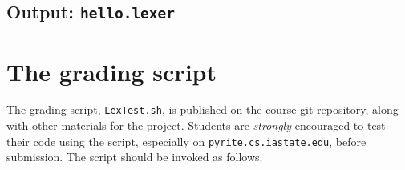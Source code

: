 \documentclass{article}
\begin{document}


\subsection{Output: {\tt hello.lexer}}








\section{The grading script}

The grading script, {\tt LexTest.sh},
is published on the course git repository,
along with other materials for the project.
Students are \emph{strongly} encouraged to test their code using
the script, especially on {\tt pyrite.cs.iastate.edu}, before submission.
The script should be invoked as follows.
\end{document}
